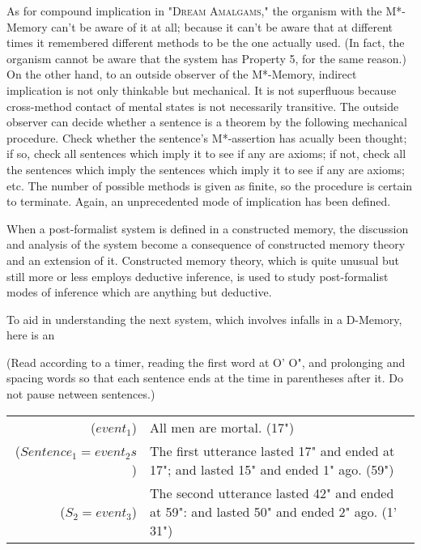 \documentclass[10pt,twoside,draft]{memoir}
\begin{document}
{As for compound implication in "\textsc{Dream Amalgams,}" the organism 
with the M*-Memory can't be aware of it at all; because it can't be aware 
that at different times it remembered different methods to be the one 
actually used. (In fact, the organism cannot be aware that the system has 
Property 5, for the same reason.) On the other hand, to an outside observer 
of the M*-Memory, indirect implication is not only thinkable but 
mechanical. It is not superfluous because cross-method contact of mental 
states is not necessarily transitive. The outside observer can decide whether a 
sentence is a theorem by the following mechanical procedure. Check 
whether the sentence's M*-assertion has acually been thought; if so, check all 
sentences which imply it to see if any are axioms; if not, check all the 
sentences which imply the sentences which imply it to see if any are axioms; 
etc. The number of possible methods is given as finite, so the procedure is 
certain to terminate. Again, an unprecedented mode of implication has been 
defined. 

When a post-formalist system is defined in a constructed memory, the 
discussion and analysis of the system become a consequence of constructed 
memory theory and an extension of it. Constructed memory theory, which 
is quite unusual but still more or less employs deductive inference, is used to 
study post-formalist modes of inference which are anything but deductive. 

To aid in understanding the next system, which involves infalls in a 
D-Memory, here is an 

{ \centering \large {} \par}

(Read according to a timer, reading the first word at O' O", and prolonging 
and spacing words so that each sentence ends at the time in parentheses after 
it. Do not pause netween sentences.) 

\begin{tabular}{ r l }
	($event_1$) &  All men are mortal. (17") \\

	($Sentence_1=event_2s$) &  The first utterance lasted 17" and ended at 17"; and lasted 15" and ended 1" ago. (59") \\

	($S_2=event_3$) & The second utterance lasted 42" and ended at 59": and lasted 50" and ended 2" ago. (1' 31") \\


\end{tabular}}
\end{document}
